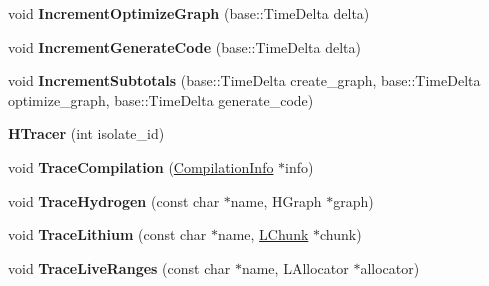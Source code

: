 \begin{DoxyCompactItemize}
\item 
\hypertarget{classv8_1_1internal_1_1_v8___f_i_n_a_l_af7c87ea26ece4a67cb923058b51f3ade}{}void {\bfseries Increment\+Optimize\+Graph} (base\+::\+Time\+Delta delta)\label{classv8_1_1internal_1_1_v8___f_i_n_a_l_af7c87ea26ece4a67cb923058b51f3ade}

\item 
\hypertarget{classv8_1_1internal_1_1_v8___f_i_n_a_l_a534d035abd703d558585023016f8eb06}{}void {\bfseries Increment\+Generate\+Code} (base\+::\+Time\+Delta delta)\label{classv8_1_1internal_1_1_v8___f_i_n_a_l_a534d035abd703d558585023016f8eb06}

\item 
\hypertarget{classv8_1_1internal_1_1_v8___f_i_n_a_l_a2ebdb6e572eee77e42e080f68469efeb}{}void {\bfseries Increment\+Subtotals} (base\+::\+Time\+Delta create\+\_\+graph, base\+::\+Time\+Delta optimize\+\_\+graph, base\+::\+Time\+Delta generate\+\_\+code)\label{classv8_1_1internal_1_1_v8___f_i_n_a_l_a2ebdb6e572eee77e42e080f68469efeb}

\item 
\hypertarget{classv8_1_1internal_1_1_v8___f_i_n_a_l_a2e3603d5bfec0c2a7cef11f13b113469}{}{\bfseries H\+Tracer} (int isolate\+\_\+id)\label{classv8_1_1internal_1_1_v8___f_i_n_a_l_a2e3603d5bfec0c2a7cef11f13b113469}

\item 
\hypertarget{classv8_1_1internal_1_1_v8___f_i_n_a_l_a7701221f100692c095976b6bd217e481}{}void {\bfseries Trace\+Compilation} (\hyperlink{classv8_1_1internal_1_1_compilation_info}{Compilation\+Info} $\ast$info)\label{classv8_1_1internal_1_1_v8___f_i_n_a_l_a7701221f100692c095976b6bd217e481}

\item 
\hypertarget{classv8_1_1internal_1_1_v8___f_i_n_a_l_a5f50fa41ed18c1a508ce656a202bf103}{}void {\bfseries Trace\+Hydrogen} (const char $\ast$name, H\+Graph $\ast$graph)\label{classv8_1_1internal_1_1_v8___f_i_n_a_l_a5f50fa41ed18c1a508ce656a202bf103}

\item 
\hypertarget{classv8_1_1internal_1_1_v8___f_i_n_a_l_ab5c45981cbec2079eaa404421cfd55c4}{}void {\bfseries Trace\+Lithium} (const char $\ast$name, \hyperlink{classv8_1_1internal_1_1_l_chunk}{L\+Chunk} $\ast$chunk)\label{classv8_1_1internal_1_1_v8___f_i_n_a_l_ab5c45981cbec2079eaa404421cfd55c4}

\item 
\hypertarget{classv8_1_1internal_1_1_v8___f_i_n_a_l_ac60e467903419d2c3431a8ef2029c642}{}void {\bfseries Trace\+Live\+Ranges} (const char $\ast$name, L\+Allocator $\ast$allocator)\label{classv8_1_1internal_1_1_v8___f_i_n_a_l_ac60e467903419d2c3431a8ef2029c642}


\end{DoxyCompactItemize}
